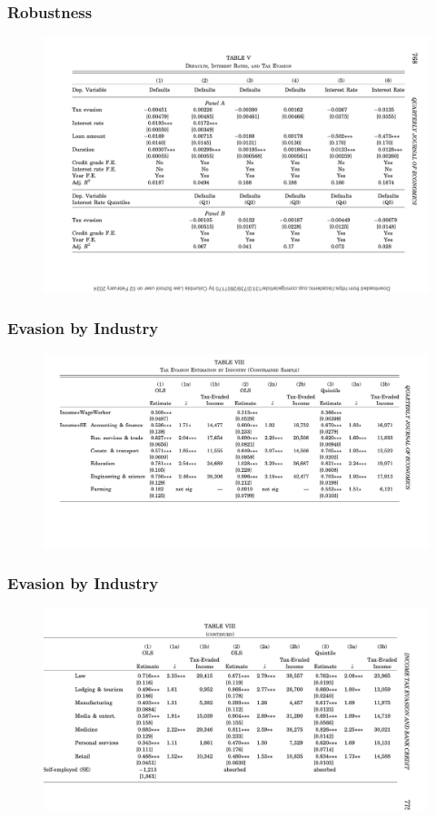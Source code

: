 \documentclass{beamer}
\begin{document}
\begin{frame}
\frametitle{Robustness}
    \begin{figure}
        \centering
\includegraphics[width=\textwidth,height=\textheight,keepaspectratio]{Paper Presentations/T5.png}
    \end{figure}
\end{frame}

\begin{frame}
\frametitle{Evasion by Industry}
    \begin{figure}
        \centering
\includegraphics[width=\textwidth,height=\textheight,keepaspectratio]{Paper Presentations/T81.png}
    \end{figure}
\end{frame}
\begin{frame}
\frametitle{Evasion by Industry}
    \begin{figure}
        \centering
\includegraphics[width=\textwidth,height=\textheight,keepaspectratio]{Paper Presentations/T82.png}
    \end{figure}
\end{frame}
\end{document}

